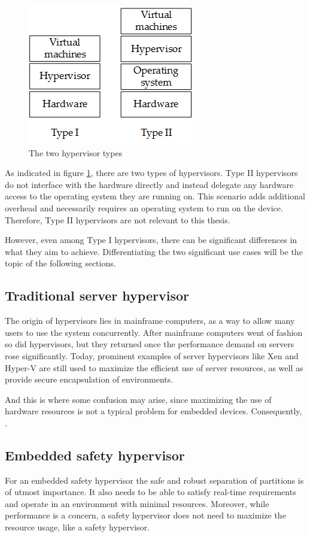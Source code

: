 \begin{figure}
\centering
\includegraphics[scale=0.75]{Figures/hypervisor_types.png}
\decoRule
\caption{The two hypervisor types}
\label{fig:hypervisor_types}
\end{figure}
As indicated in figure \ref{fig:hypervisor_types}, there are two types of hypervisors. Type II hypervisors do not interface with the hardware directly and instead delegate any hardware access to the operating system they are running on. This scenario adds additional overhead and necessarily requires an operating system to run on the device. Therefore, Type II hypervisors are not relevant to this thesis.

However, even among Type I hypervisors, there can be significant differences in what they aim to achieve. Differentiating the two significant use cases will be the topic of the following sections.
\subsection{Traditional server hypervisor}
The origin of hypervisors lies in mainframe computers, as a way to allow many users to use the system concurrently. After mainframe computers went of fashion so did hypervisors, but they returned once the performance demand on servers rose significantly.
Today, prominent examples of server hypervisors like Xen and Hyper-V are still used to maximize the efficient use of server resources, as well as provide secure encapsulation of environments.

And this is where some confusion may arise, since maximizing the use of hardware resources is not a typical problem for embedded devices. Consequently, .
\subsection{Embedded safety hypervisor}
For an embedded safety hypervisor the safe and robust separation of partitions is of utmost importance. It also needs to be able to satisfy real-time requirements and operate in an environment with minimal resources. Moreover, while performance is a concern, a safety hypervisor does not need to maximize the resource usage, like a safety hypervisor.

